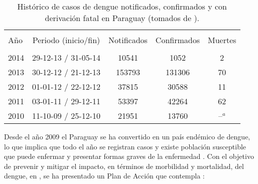 \begin{table}[H]
    \begin{minipage}{\textwidth}
        \begin{center}
        \caption{\label{tab:cap3-historico-casos-dengue} Histórico de casos de dengue notificados, confirmados y con derivación fatal en Paraguay (tomados de \citep{website:mspbsHistoria2014}).}
        \begin{tabular}{p{3cm} c c c c}
            \hline\\
            Año & Periodo (inicio/fin) & Notificados & Confirmados & Muertes\\
            \hline
            \hline\\
            2014 & 29-12-13 / 31-05-14 & 10541 & 1052 & 2\\
            2013 & 30-12-12 / 21-12-13 & 153793 & 131306 & 70\\
            2012 & 01-01-12 / 22-12-12 & 37815 & 30588 & 11\\
            2011 & 03-01-11 / 29-12-11 & 53397 & 42264 & 62\\
            2010 & 11-10-09 / 25-12-10 & 21951 & 13760 & --$^a$\\
        \end{tabular}
        \end{center}
    \end{minipage}
\end{table}


Desde el año 2009 el Paraguay se ha convertido en un país endémico de dengue, lo que implica que
todo el año se registran casos y existe población susceptible que puede enfermar y presentar formas graves de la enfermedad \cite{planControlMspbs2014}. Con el objetivo de prevenir y mitigar
el impacto, en términos de morbilidad y mortalidad, del dengue, en \cite{planControlMspbs2014}, se
ha presentado un Plan de Acción que contempla :

